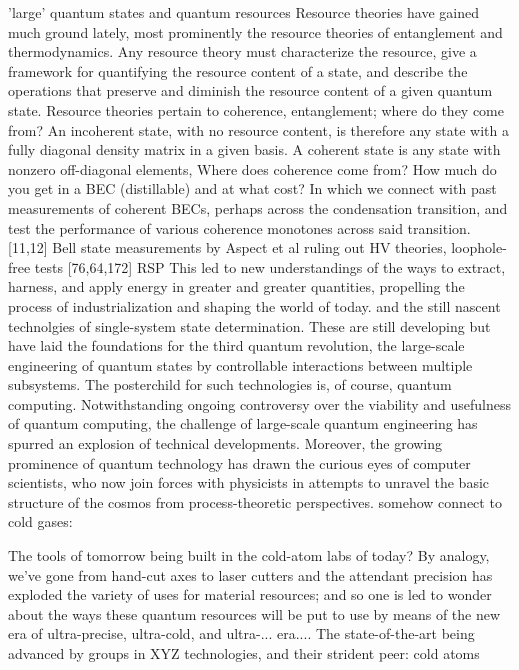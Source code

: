 	
	'large' quantum states and quantum resources
	Resource theories have gained much ground lately, most prominently the resource theories of entanglement and thermodynamics.
	Any resource theory must characterize the resource, give a framework for quantifying the resource content of a state, and describe the operations that preserve and diminish the resource content of a given quantum state.
	Resource theories pertain to coherence, entanglement; where do they come from? An incoherent state, with no resource content, is therefore any state with a fully diagonal density matrix in a given basis.
	A coherent state is any state with  nonzero off-diagonal elements, Where does coherence come from? How much do you get in a BEC (distillable) and at what cost?	In which we connect with past measurements of coherent BECs, perhaps across the condensation transition, and test the performance of various coherence monotones across said transition.
	[11,12] Bell state measurements by Aspect et al ruling out HV theories, loophole-free tests [76,64,172] RSP
	This led to new understandings of the ways to extract, harness, and apply energy in greater and greater quantities, propelling the process of industrialization and shaping the world of today.
	and the still nascent technolgies of single-system state determination.
	These are still developing but have laid the foundations for the third
	quantum revolution, the large-scale engineering of quantum states by
	controllable interactions between multiple subsystems.
	The posterchild
	for such technologies is, of course, quantum computing.
	Notwithstanding
	ongoing controversy over the viability and usefulness of quantum
	computing, the challenge of large-scale quantum engineering has spurred
	an explosion of technical developments.
	Moreover, the growing prominence
	of quantum technology has drawn the curious eyes of computer scientists,
	who now join forces with physicists in attempts to unravel the basic
	structure of the cosmos from process-theoretic perspectives.
	somehow connect to cold gases: 

The tools of tomorrow being built in the cold-atom labs of today? By analogy, we've gone from hand-cut axes to laser cutters and the attendant precision has exploded the variety of uses for material resources; and so one is led to wonder about the ways these quantum resources will be put to use by means of the new era of ultra-precise, ultra-cold, and ultra-... era.... The state-of-the-art being advanced by groups in XYZ technologies, and their strident peer: cold atoms
	
